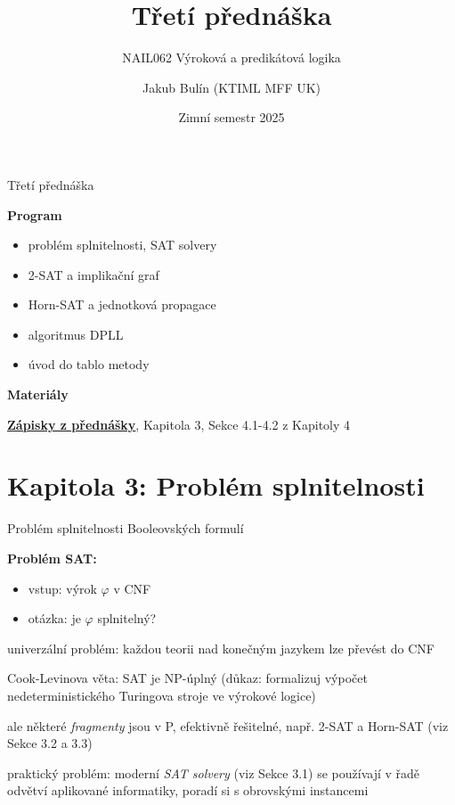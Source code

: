 \documentclass{beamer}
\title{Třetí přednáška}
\subtitle{NAIL062 Výroková a predikátová logika}
\author{Jakub Bulín (KTIML MFF UK)}
\date{Zimní semestr 2025}
\begin{document}
\maketitle


\begin{frame}{Třetí přednáška}

    \textbf{Program}
        \begin{itemize}
            \item problém splnitelnosti, SAT solvery
            \item 2-SAT a implikační graf
            \item Horn-SAT a jednotková propagace
            \item algoritmus DPLL
            \item úvod do tablo metody
        \end{itemize}

    \textbf{Materiály}

        \href{https://github.com/jbulin-mff-uk/nail062/raw/main/lecture/lecture-notes/lecture-notes.pdf}{\alert{\textbf{Zápisky z přednášky}}}, Kapitola 3, Sekce 4.1-4.2 z Kapitoly 4

\end{frame}


\section{\sc Kapitola 3: Problém splnitelnosti}


\begin{frame}{Problém splnitelnosti Booleovských formulí}
   
    \textbf{Problém SAT:}
    \begin{itemize}
        \item vstup: výrok $\varphi$ v CNF
        \item otázka: je $\varphi$ splnitelný? 
    \end{itemize}

    \pause
    \alert{univerzální problém}: každou teorii nad konečným jazykem lze převést do CNF

    \pause
    \alert{Cook-Levinova věta}: SAT je NP-úplný (důkaz: formalizuj výpočet nedeterministického Turingova stroje ve výrokové logice)

    \pause
    ale některé \emph{fragmenty} jsou v P, efektivně řešitelné, např. 2-SAT a Horn-SAT (viz Sekce 3.2 a 3.3)

    \pause
    \alert{praktický problém}: moderní \emph{SAT solvery} (viz Sekce 3.1) se používají v řadě odvětví aplikované informatiky, poradí si s obrovskými instancemi
    
\end{frame}
\end{document}
